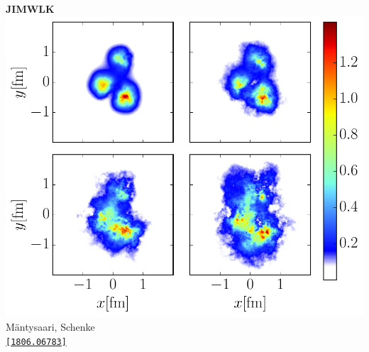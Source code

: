 \documentclass[aspectratio=169,11pt,usenames,dvipsnames]{beamer}
\begin{document}
\begin{frame}[noframenumbering]
{\begin{columns}[onlytextwidth,c]
            \begin{center}
                {\scriptsize\bfseries JIMWLK}
                \\[1pt]
                \includegraphics[width=0.7\columnwidth]{images/density_mv_fluct_crop.pdf}
                \\[-6pt]
                {\tiny Mäntysaari, Schenke} \\ \tiny \href{https://arxiv.org/abs/1806.06783}{\color{blue}\texttt{[1806.06783]}\scalebox{.6}{$^\text{\tiny\faExternalLink}$}}
            \end{center}
    \end{columns}  
    }


\end{frame}
\end{document}
